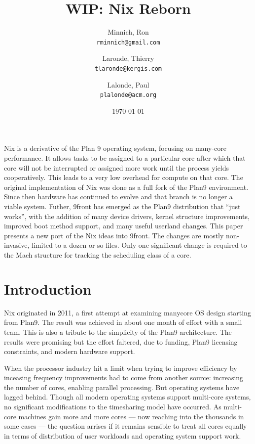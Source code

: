 \documentclass{article}
\title{WIP: Nix Reborn}
\author{Minnich, Ron\\
	\texttt{rminnich@gmail.com}
	\and
	Laronde, Thierry\\
	\texttt{tlaronde@kergis.com}
	\and
	Lalonde, Paul\\
	\texttt{plalonde@acm.org}
	}
\date{\today}
\begin{document}
 
\newcommand{\PAL}[1]{{\em PAL: #1}}
\maketitle 
\abstract
Nix is a derivative of the Plan 9 operating system\cite{Pike:1990:PBLa}, focusing on many-core performance. It allows tasks to be assigned to a particular core after which
that core will not be interrupted or assigned more work until the process yields cooperatively.  This leads to a very low overhead for compute on that core.
The original implementation of Nix \cite{Ballesteros2012} was done as a full fork of the Plan9 environment.  Since then hardware has continued to evolve and
that branch is no longer a viable system.
Futher, 9front has emerged as the Plan9 distribution that ``just works'', with the addition of many device drivers, kernel structure improvements, improved
 boot method support, and many useful userland changes.
This paper presents a new port of the Nix ideas into 9front.  The changes are mostly non-invasive, limited to a dozen or so files.  Only one significant change is required to the Mach structure for tracking the scheduling class of a core.

\section{Introduction}
Nix originated in 2011, a first attempt at examining manycore OS design starting from Plan9.
The result was achieved in about one month of effort with a small team\cite{Ballesteros2012}.  This is also a tribute to the simplicity of the Plan9
architecture. %
The results were promising but the effort faltered, due to funding, Plan9 licensing constraints, and modern hardware support.

When the processor industry hit a limit when trying to improve efficiency by inceasing frequency improvements had to come from
another source: increasing the number of cores, enabling parallel processing.
But operating systems have lagged behind.
Though all modern operating systems support multi-core systems, no significant modifications to the timesharing model have occurred.
As multi-core machines gain more and more cores --- now reaching into the thousands in some cases \cite{Ditzel2022} --- the question arrises if it remains sensible to treat all cores equally in terms of distribution of user workloads and operating system support work.
\end{document}
